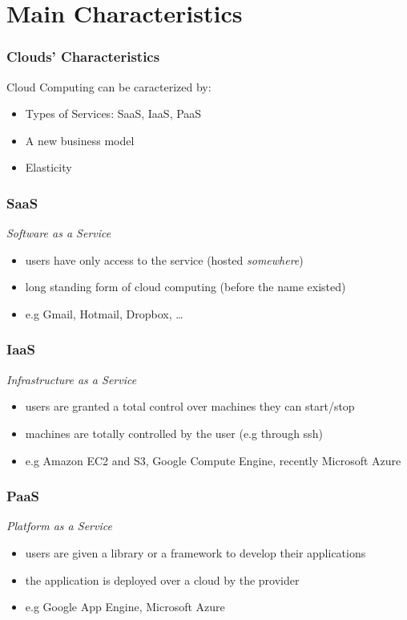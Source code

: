 \documentclass[bigger,hyperref={colorlinks=true, urlcolor=red, plainpages=false, pdfpagelabels, bookmarksnumbered}]{beamer}
\begin{document}
\section{Main Characteristics}
\label{sec-2}
\begin{frame}
\frametitle{Clouds' Characteristics}
\label{sec-2-1}

Cloud Computing can be caracterized by:
\begin{itemize}
\item Types of Services: SaaS, IaaS, PaaS
\item A new business model
\item Elasticity
\end{itemize}
\end{frame}
\begin{frame}
\frametitle{SaaS}
\label{sec-2-2}

\emph{Software as a Service} 
\begin{itemize}
\item users have only access to the service (hosted \emph{somewhere})
\item long standing form of cloud computing (before the name existed)
\item e.g Gmail, Hotmail, Dropbox, \ldots{}
\end{itemize}
\end{frame}
\begin{frame}
\frametitle{IaaS}
\label{sec-2-3}

\emph{Infrastructure as a Service}
\begin{itemize}
\item users are granted a total control over machines they can start/stop
\item machines are totally controlled by the user (e.g through ssh)
\item e.g Amazon EC2 and S3, Google Compute Engine, recently Microsoft Azure
\end{itemize}
\end{frame}
\begin{frame}
\frametitle{PaaS}
\label{sec-2-4}

\emph{Platform as a Service}
\begin{itemize}
\item users are given a library or a framework to develop their applications
\item the application is deployed over a cloud by the provider
\item e.g Google App Engine, Microsoft Azure
\end{itemize}
\end{frame}
\end{document}
